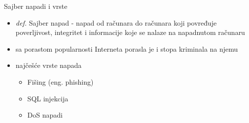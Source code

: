     \begin{frame}{Sajber napadi i vrste}
    \begin{itemize}
	\item \textit{def.} Sajber napad - napad od računara do računara koji povređuje poverljivost, integritet i informacije koje se nalaze na napadnutom računaru  
	\item sa porastom popularnosti Interneta porasla je i stopa kriminala na njemu
	\item najčešće vrste napada
	\begin{itemize}
	\item Fišing (eng. phishing)
	\item SQL injekcija
	\item DoS napadi
\end{itemize}	  
    \end{itemize}
    \end{frame}
    
    
